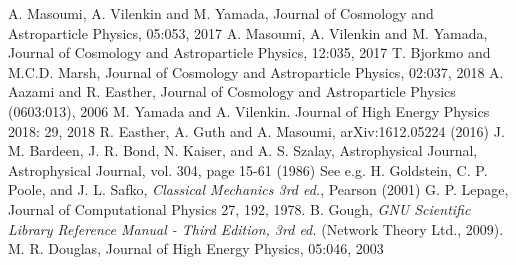 \documentclass[12pt]{article}
\begin{document}
\begin{thebibliography}{99}
 A. Masoumi, A. Vilenkin and M. Yamada, Journal of Cosmology and Astroparticle Physics, 05:053, 2017
 A. Masoumi, A. Vilenkin and M. Yamada, Journal of Cosmology and Astroparticle Physics, 12:035, 2017
 T. Bjorkmo and M.C.D. Marsh, Journal of Cosmology and Astroparticle Physics, 02:037, 2018
 A. Aazami and R. Easther, Journal of Cosmology and Astroparticle Physics (0603:013), 2006
 M. Yamada and A. Vilenkin. Journal of High Energy Physics 2018: 29, 2018
 R. Easther, A. Guth and A. Masoumi, arXiv:1612.05224 (2016)
 J. M. Bardeen, J. R. Bond, N. Kaiser, and A. S. Szalay, Astrophysical Journal, Astrophysical Journal, vol. 304, page 15-61 (1986)
 See e.g. H. Goldstein, C. P. Poole, and J. L. Safko, \emph{Classical Mechanics 3rd ed.}, Pearson (2001)
 G. P. Lepage, Journal of Computational Physics 27, 192, 1978.
 B. Gough, \emph{GNU Scientific Library Reference Manual - Third Edition, 3rd ed.} (Network Theory Ltd., 2009).
 M. R. Douglas, Journal of High Energy Physics, 05:046, 2003
\end{thebibliography}
\end{document}

